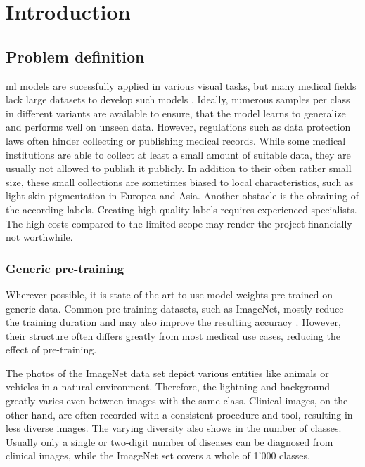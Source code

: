 \chapter{Introduction}\label{chapter_1}

\section{Problem definition}

\gls{ml} models are sucessfully applied in various visual tasks, but many medical fields lack large datasets to develop such models \autocite{castro2019}. 
Ideally, numerous samples per class in different variants are available to ensure, that the model learns to generalize and performs well on unseen data. 
However, regulations such as data protection laws often hinder collecting or publishing medical records. 
While some medical institutions are able to collect at least a small amount of suitable data, they are usually not allowed to publish it publicly. 
In addition to their often rather small size, these small collections are sometimes biased to local characteristics, such as light skin pigmentation in Europea and Asia.
Another obstacle is the obtaining of the according labels. Creating high-quality labels requires experienced specialists. 
The high costs compared to the limited scope may render the project financially not worthwhile.

\subsection{Generic pre-training}
Wherever possible, it is state-of-the-art to use model weights pre-trained on generic data. 
Common pre-training datasets, such as ImageNet, mostly reduce the training duration and may also improve the resulting accuracy \autocite{deng2009}.
However, their structure often differs greatly from most medical use cases, reducing the effect of pre-training. 

The photos of the ImageNet data set depict various entities like animals or vehicles in a natural environment. 
Therefore, the lightning and background greatly varies even between images with the same class.
Clinical images, on the other hand, are often recorded with a consistent procedure and tool, resulting in less diverse images.
The varying diversity also shows in the number of classes. 
Usually only a single or two-digit number of diseases can be diagnosed from clinical images, while the ImageNet set covers a whole of 1'000 classes.

